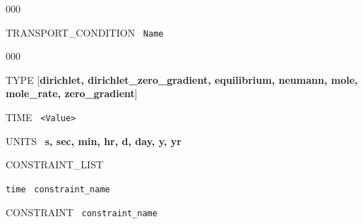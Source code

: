\begin{deflist}{000}
\item[TRANSPORT\_CONDITION] \ {\tt Name}

\begin{deflist}{000}
\item[TYPE] [{\bf dirichlet, dirichlet\_zero\_gradient, equilibrium, neumann, mole, mole\_rate, \linebreak zero\_gradient}]
\item[TIME] \ {\tt <Value>}
\item[UNITS] \ {\bf s, sec, min, hr, d, day, y, yr}
\item[CONSTRAINT\_LIST]
\item {\tt time} \ {\tt constraint\_name}
\item[\keyend]
\item[CONSTRAINT] \ {\tt constraint\_name}
\end{deflist}
\item[\keyend]
\end{deflist}


